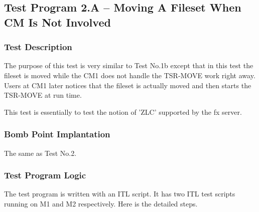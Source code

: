 \pagebreak 
\subsection {Test Program 2.A -- Moving A Fileset When CM Is Not Involved}

\subsubsection {Test Description}

The purpose of this test is very similar to Test No.1b except that in this
test the fileset is moved while the CM1 does not handle the TSR-MOVE work
right away. Users at CM1 later notices that the fileset is actually moved
and then starts the TSR-MOVE at run time.

This test is essentially to test the notion of 'ZLC' supported by the fx
server.

\subsubsection {Bomb Point Implantation}

The same as Test No.2.

\subsubsection {Test Program Logic}

The test program is written with an ITL script. It has two ITL test scripts
running on M1 and M2 respectively. Here is the detailed steps. 

